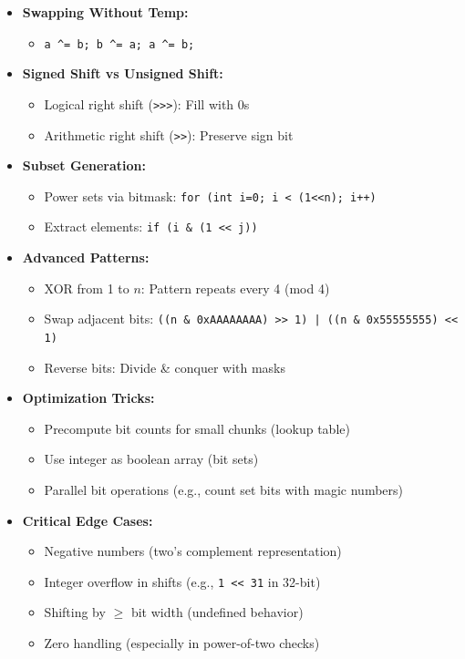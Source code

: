 \documentclass[a4paper,10pt]{book}
\begin{document}
\begin{itemize}
    \item \textbf{Swapping Without Temp:}
    \begin{itemize}
        \item \texttt{a \^{}= b; b \^{}= a; a \^{}= b;}
    \end{itemize}
    
    \item \textbf{Signed Shift vs Unsigned Shift:}
    \begin{itemize}
        \item Logical right shift (\texttt{>>>}): Fill with 0s
        \item Arithmetic right shift (\texttt{>>}): Preserve sign bit
    \end{itemize}
    
    \item \textbf{Subset Generation:}
    \begin{itemize}
        \item Power sets via bitmask: \texttt{for (int i=0; i < (1<<n); i++)}
        \item Extract elements: \texttt{if (i \& (1 << j))}
    \end{itemize}
    
    \item \textbf{Advanced Patterns:}
    \begin{itemize}
        \item XOR from 1 to $n$: Pattern repeats every 4 (mod 4)
        \item Swap adjacent bits: \texttt{((n \& 0xAAAAAAAA) >> 1) | ((n \& 0x55555555) << 1)}
        
        \item Reverse bits: Divide \& conquer with masks
    \end{itemize}
    
    \item \textbf{Optimization Tricks:}
    \begin{itemize}
        \item Precompute bit counts for small chunks (lookup table)
        \item Use integer as boolean array (bit sets)
        
        \item Parallel bit operations (e.g., count set bits with magic numbers)
    \end{itemize}
    
    \item \textbf{Critical Edge Cases:}
    \begin{itemize}
        \item Negative numbers (two's complement representation)
        \item Integer overflow in shifts (e.g., \texttt{1 << 31} in 32-bit)
        \item Shifting by $\geq$ bit width (undefined behavior)
        \item Zero handling (especially in power-of-two checks)
    \end{itemize}
    

\end{itemize}
\end{document}
